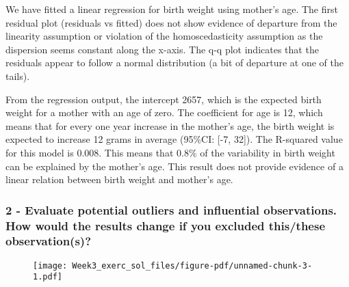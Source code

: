 \documentclass[
  letterpaper,
  DIV=11,
  numbers=noendperiod]{scrreprt}
\newenvironment{Shaded}{\begin{snugshade}}{\end{snugshade}}
\newcommand{\AttributeTok}[1]{\textcolor[rgb]{0.40,0.45,0.13}{#1}}
\newcommand{\CommentTok}[1]{\textcolor[rgb]{0.37,0.37,0.37}{#1}}
\newcommand{\DecValTok}[1]{\textcolor[rgb]{0.68,0.00,0.00}{#1}}
\newcommand{\FunctionTok}[1]{\textcolor[rgb]{0.28,0.35,0.67}{#1}}
\newcommand{\NormalTok}[1]{\textcolor[rgb]{0.00,0.23,0.31}{#1}}
\newcommand{\SpecialCharTok}[1]{\textcolor[rgb]{0.37,0.37,0.37}{#1}}
\begin{document}
We have fitted a linear regression for birth weight using mother's age.
The first residual plot (residuals vs fitted) does not show evidence of
departure from the linearity assumption or violation of the
homoscedasticity assumption as the dispersion seems constant along the
x-axis. The q-q plot indicates that the residuals appear to follow a
normal distribution (a bit of departure at one of the tails).

From the regression output, the intercept 2657, which is the expected
birth weight for a mother with an age of zero. The coefficient for age
is 12, which means that for every one year increase in the mother's age,
the birth weight is expected to increase 12 grams in average (95\%CI:
{[}-7, 32{]}). The R-squared value for this model is 0.008. This means
that 0.8\% of the variability in birth weight can be explained by the
mother's age. This result does not provide evidence of a linear relation
between birth weight and mother's age.

\hypertarget{evaluate-potential-outliers-and-influential-observations.-how-would-the-results-change-if-you-excluded-thisthese-observations}{%
\subsubsection{2 - Evaluate potential outliers and influential
observations. How would the results change if you excluded this/these
observation(s)?}\label{evaluate-potential-outliers-and-influential-observations.-how-would-the-results-change-if-you-excluded-thisthese-observations}}

\begin{Shaded}
\end{Shaded}

\begin{figure}[H]

{\centering \texttt{[image: Week3\_exerc\_sol\_files/figure-pdf/unnamed-chunk-3-1.pdf]}

}

\end{figure}
\end{document}
